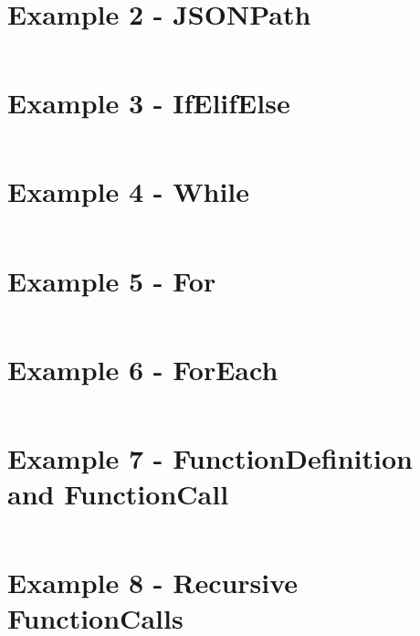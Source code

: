 \documentclass[]{full}
\theoremstyle{definition}
\begin{document}
\section{Example 2 - JSONPath}
\label{appendix:sttp-examples-2}
\inputminted[autogobble, breaklines, tabsize=4]{text}{../../src/_examples/example_02/example_02.sttp}

\section{Example 3 - IfElifElse}
\label{appendix:sttp-examples-3}
\inputminted[autogobble, breaklines, tabsize=4]{text}{../../src/_examples/example_03/example_03.sttp}

\section{Example 4 - While}
\label{appendix:sttp-examples-4}
\inputminted[autogobble, breaklines, tabsize=4]{text}{../../src/_examples/example_04/example_04.sttp}

\section{Example 5 - For}
\label{appendix:sttp-examples-5}
\inputminted[autogobble, breaklines, tabsize=4]{text}{../../src/_examples/example_05/example_05.sttp}

\section{Example 6 - ForEach}
\label{appendix:sttp-examples-6}
\inputminted[autogobble, breaklines, tabsize=4]{text}{../../src/_examples/example_06/example_06.sttp}

\section{Example 7 - FunctionDefinition and FunctionCall}
\label{appendix:sttp-examples-7}
\inputminted[autogobble, breaklines, tabsize=4]{text}{../../src/_examples/example_07/example_07.sttp}

\section{Example 8 - Recursive FunctionCalls}
\label{appendix:sttp-examples-8}
\inputminted[autogobble, breaklines, tabsize=4]{text}{../../src/_examples/example_08/example_08.sttp}
\end{document}
